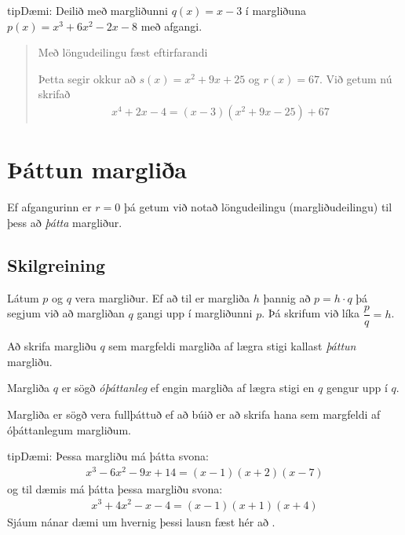 \documentclass[a4paper,10pt,icelandic]{sphinxmanual}
\begin{document}
\begin{sphinxadmonition}{tip}{Dæmi:}
 Deilið með margliðunni \(q(x)=x-3\) í margliðuna \(p(x) =x^3 + 6x^2 -2x - 8\) með afgangi.
\begin{quote}

Með löngudeilingu fæst eftirfarandi


Þetta segir okkur að \(s(x) =x^2+ 9x +25\) og \(r(x) = 67\). Við getum nú skrifað
\begin{equation*}
\begin{split}x^4 +2x -4 = (x-3)(x^2 + 9x - 25) + 67\end{split}
\end{equation*}\end{quote}
\end{sphinxadmonition}


\section{Þáttun margliða}
\label{\detokenize{Kafli06:attun-marglia}}
Ef afgangurinn er \(r=0\) þá getum við notað löngudeilingu (margliðudeilingu) til þess að \textit{þátta} margliður.


\subsection{Skilgreining}
\label{\detokenize{Kafli06:skilgreining}}
Látum \(p\) og \(q\) vera margliður. Ef að til er margliða \(h\) þannig að \(p=h \cdot q\) þá segjum við að margliðan \(q\) gangi upp í margliðunni \(p\). Þá skrifum við líka \(\dfrac{p}{q}=h\).

Að skrifa margliðu \(q\) sem margfeldi margliða af lægra stigi kallast \textit{þáttun} margliðu.

Margliða \(q\) er sögð \textit{óþáttanleg} ef engin margliða af lægra stigi en \(q\) gengur upp í \(q\).

Margliða er sögð vera fullþáttuð ef að búið er að skrifa hana sem margfeldi af óþáttanlegum margliðum.

\begin{sphinxadmonition}{tip}{Dæmi:}
Þessa margliðu má þátta svona:
\begin{equation*}
\begin{split}x^3-6x^2-9x+14 = (x-1)(x+2)(x-7)\end{split}
\end{equation*}
og til dæmis má þátta þessa margliðu svona:
\begin{equation*}
\begin{split}x^3+4x^2-x-4 = (x-1)(x+1)(x+4)\end{split}
\end{equation*}
Sjáum nánar dæmi um hvernig þessi lausn fæst hér að {\hyperref[\detokenize{Kafli06:s-daemi}]{}}.
\end{sphinxadmonition}
\end{document}
